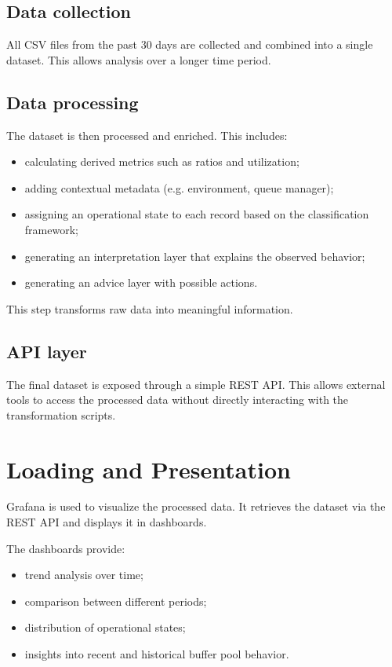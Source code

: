 \subsection{Data collection}

All CSV files from the past 30 days are collected and combined into a single dataset. This allows analysis over a longer time period.

\subsection{Data processing}

The dataset is then processed and enriched. This includes:
\begin{itemize}
    \item calculating derived metrics such as ratios and utilization;
    \item adding contextual metadata (e.g. environment, queue manager);
    \item assigning an operational state to each record based on the classification framework;
    \item generating an interpretation layer that explains the observed behavior;
    \item generating an advice layer with possible actions.
\end{itemize}

This step transforms raw data into meaningful information.

\subsection{API layer}

The final dataset is exposed through a simple REST API. This allows external tools to access the processed data without directly interacting with the transformation scripts.

\section{Loading and Presentation}

Grafana is used to visualize the processed data. It retrieves the dataset via the REST API and displays it in dashboards.

The dashboards provide:
\begin{itemize}
    \item trend analysis over time;
    \item comparison between different periods;
    \item distribution of operational states;
    \item insights into recent and historical buffer pool behavior.
\end{itemize}

